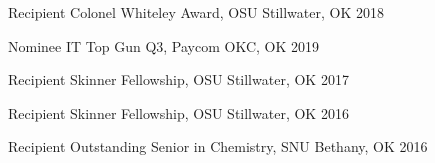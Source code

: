 



\begin{cvhonors}

  \cvhonor
    {Recipient} %
    {Colonel Whiteley Award, OSU} %
    {Stillwater, OK} %
    {2018} %
    
  \cvhonor
	{Nominee} %
	{IT Top Gun Q3, Paycom} %
	{OKC, OK} %
	{2019} %

 \cvhonor
	{Recipient} %
	{Skinner Fellowship, OSU} %
	{Stillwater, OK} %
	{2017} %

 \cvhonor 
	{Recipient} %
	{Skinner Fellowship, OSU} %
	{Stillwater, OK} %
	{2016} %

 \cvhonor
 	{Recipient} %
	{Outstanding Senior in Chemistry, SNU} %
	{Bethany, OK} %
	{2016} %



\end{cvhonors}
